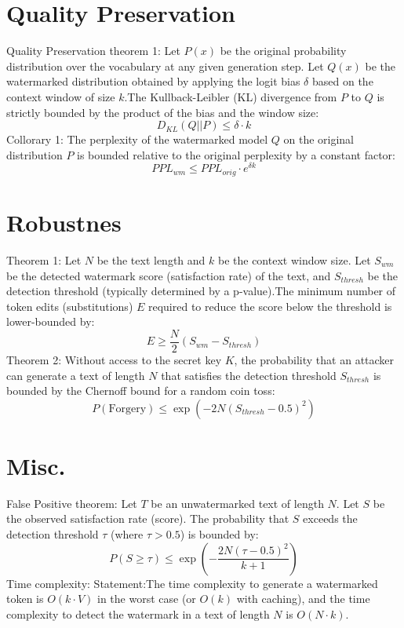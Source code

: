 \documentclass{article}
\begin{document}
\section{Quality Preservation}
Quality Preservation theorem 1:
Let $P(x)$ be the original probability distribution over the vocabulary at any given generation step. Let $Q(x)$ be the watermarked distribution obtained by applying the logit bias $\delta$ based on the context window of size $k$.The Kullback-Leibler (KL) divergence from $P$ to $Q$ is strictly bounded by the product of the bias and the window size:$$D_{KL}(Q || P) \le \delta \cdot k$$
Collorary 1:
The perplexity of the watermarked model $Q$ on the original distribution $P$ is bounded relative to the original perplexity by a constant factor:$$PPL_{wm} \le PPL_{orig} \cdot e^{\delta k}$$
\section{Robustnes}
Theorem 1:
Let $N$ be the text length and $k$ be the context window size. Let $S_{wm}$ be the detected watermark score (satisfaction rate) of the text, and $S_{thresh}$ be the detection threshold (typically determined by a p-value).The minimum number of token edits (substitutions) $E$ required to reduce the score below the threshold is lower-bounded by:$$E \ge \frac{N}{2} \left( S_{wm} - S_{thresh} \right)$$
Theorem 2:
Without access to the secret key $K$, the probability that an attacker can generate a text of length $N$ that satisfies the detection threshold $S_{thresh}$ is bounded by the Chernoff bound for a random coin toss:$$P(\text{Forgery}) \le \exp \left( -2N (S_{thresh} - 0.5)^2 \right)$$
\section{Misc.}
False Positive theorem: 
Let $T$ be an unwatermarked text of length $N$. Let $S$ be the observed satisfaction rate (score). The probability that $S$ exceeds the detection threshold $\tau$ (where $\tau > 0.5$) is bounded by:$$P(S \ge \tau) \le \exp\left( -\frac{2N(\tau - 0.5)^2}{k + 1} \right)$$
Time complexity:
Statement:The time complexity to generate a watermarked token is $O(k \cdot V)$ in the worst case (or $O(k)$ with caching), and the time complexity to detect the watermark in a text of length $N$ is $O(N \cdot k)$.
\end{document}
